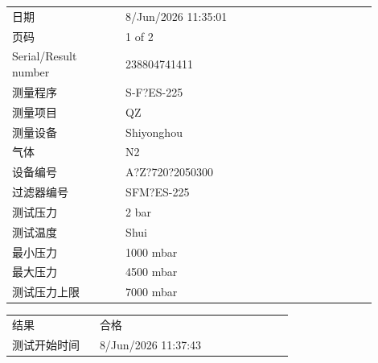 \documentclass[UTF8,10pt,a4paper,fontset=fandol]{ctexart}
\newcommand{\fieldvalue}[1]{#1}
\begin{document}
\begin{tabular}{@{}p{0.28\linewidth}p{0.62\linewidth}@{}}
日期 &
\fieldvalue{8/Jun/2026 11:35:01}
\\
页码 &
\fieldvalue{1 of 2}
\\
Serial/Result number &
\fieldvalue{238804741411}
\\
测量程序 &
\fieldvalue{S-F?ES-225}
\\
测量项目 &
\fieldvalue{QZ}
\\
测量设备 &
\fieldvalue{Shiyonghou}
\\
气体 &
\fieldvalue{N2}
\\
设备编号 &
\fieldvalue{A?Z?720?2050300}
\\
过滤器编号 &
\fieldvalue{SFM?ES-225}
\\
测试压力 &
\fieldvalue{2 bar}
\\
测试温度 &
\fieldvalue{Shui}
\\
最小压力 &
\fieldvalue{1000 mbar}
\\
最大压力 &
\fieldvalue{4500 mbar}
\\
测试压力上限 &
\fieldvalue{7000 mbar}
\end{tabular}

\vspace{0.5em}

\begin{tabular}{@{}p{0.28\linewidth}p{0.62\linewidth}@{}}
结果 &
\fieldvalue{合格}
\\
测试开始时间 &
\fieldvalue{8/Jun/2026 11:37:43}
\end{tabular}

\vspace{0.5em}
\end{document}
